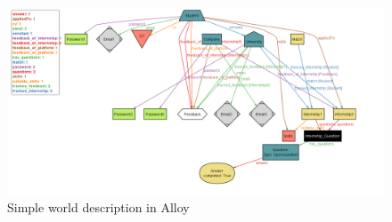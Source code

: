 \begin{figure}
    \centering
    \includegraphics[angle=270, width=0.65\linewidth]{Images/ImagesRASD/AlloySimpleWorld.png}
    \caption{Simple world description in Alloy}
    \label{fig:simple-world}
\end{figure}



\pagebreak
